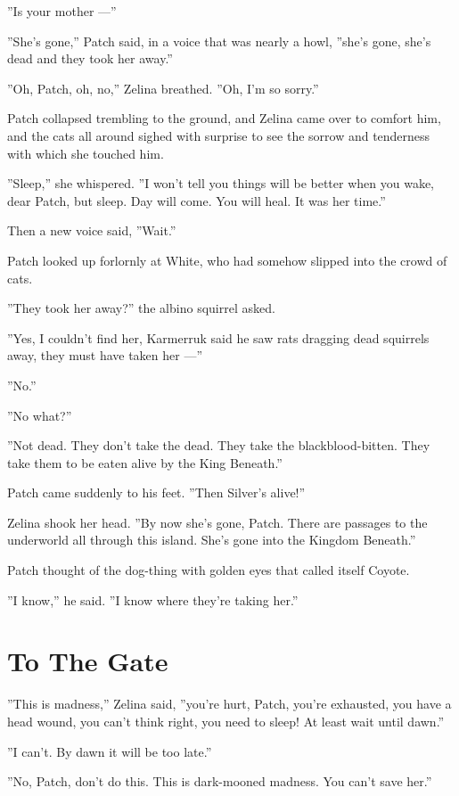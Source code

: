 \documentclass[12pt]{book}
\begin{document}
''Is your mother ---''

''She's gone,'' Patch said, in a voice that was nearly a howl, ''she's
gone, she's dead and they took her away.''

''Oh, Patch, oh, no,'' Zelina breathed. ''Oh, I'm so sorry.''

Patch collapsed trembling to the ground, and Zelina came over to
comfort him, and the cats all around sighed with surprise to see the
sorrow and tenderness with which she touched him.

''Sleep,'' she whispered. ''I won't tell you things will be better
when you wake, dear Patch, but sleep. Day will come. You will heal. It
was her time.''

Then a new voice said, ''Wait.''

Patch looked up forlornly at White, who had somehow slipped into the
crowd of cats.

''They took her away?'' the albino squirrel asked.

''Yes, I couldn't find her, Karmerruk said he saw rats dragging dead
squirrels away, they must have taken her ---''

''No.''

''No what?''

''Not dead. They don't take the dead. They take the
blackblood-bitten. They take them to be eaten alive by the King
Beneath.''

Patch came suddenly to his feet. ''Then Silver's alive!''

Zelina shook her head. ''By now she's gone, Patch. There are passages
to the underworld all through this island. She's gone into the Kingdom
Beneath.''

Patch thought of the dog-thing with golden eyes that called itself
Coyote.

''I know,'' he said. ''I know where they're taking her.''


\section{To The Gate}

''This is madness,'' Zelina said, ''you're hurt, Patch, you're
exhausted, you have a head wound, you can't think right, you need to
sleep! At least wait until dawn.''

''I can't. By dawn it will be too late.''

''No, Patch, don't do this. This is dark-mooned madness. You can't
save her.''
\end{document}
